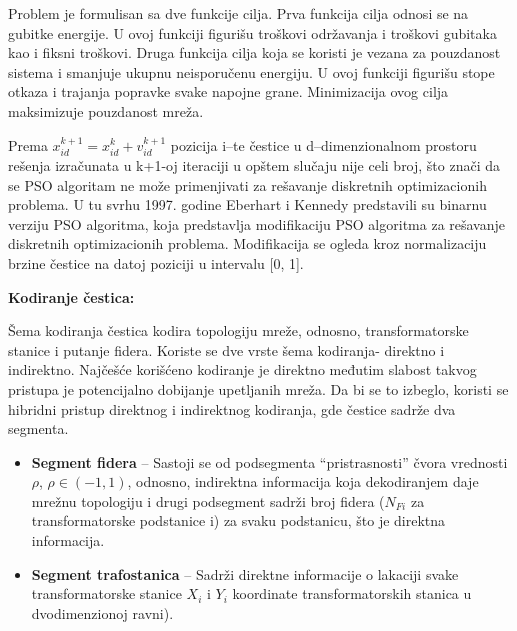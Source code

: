 \documentclass[a4paper]{article}
\begin{document}
\vspace{5mm} 

Problem je formulisan sa dve funkcije cilja. Prva funkcija cilja odnosi se na gubitke energije. U ovoj funkciji figurišu troškovi održavanja i troškovi gubitaka kao i fiksni troškovi. Druga funkcija cilja koja se koristi je vezana za pouzdanost sistema i smanjuje ukupnu neisporučenu energiju. U ovoj funkciji figurišu stope otkaza i trajanja popravke svake napojne grane. Minimizacija ovog cilja maksimizuje pouzdanost mreža.

\vspace{5mm} 

Prema \(x_{i d}^{k+1} = x_{i d}^{k} + v_{i d}^{k+1}  \) pozicija i–te čestice u d–dimenzionalnom prostoru rešenja izračunata u k+1-oj iteraciji u opštem slučaju nije celi broj, što znači da se PSO algoritam ne može primenjivati za rešavanje diskretnih optimizacionih problema. U tu svrhu 1997. godine Eberhart i Kennedy predstavili su binarnu verziju PSO algoritma, koja predstavlja modifikaciju PSO algoritma za rešavanje diskretnih optimizacionih problema. Modifikacija se ogleda kroz normalizaciju brzine čestice na datoj poziciji u intervalu [0, 1].

\vspace{10mm} 

\begin{flushleft}
\textbf{Kodiranje čestica:} 
\end{flushleft}

Šema kodiranja čestica kodira topologiju mreže, odnosno, transformatorske stanice i putanje fidera. Koriste se dve vrste šema kodiranja- direktno i indirektno. Najčešće korišćeno kodiranje je direktno međutim slabost takvog pristupa je potencijalno dobijanje upetljanih mreža. Da bi se to izbeglo, koristi se hibridni pristup direktnog i indirektnog kodiranja, gde čestice sadrže dva segmenta.

\vspace{5mm} 

\begin{itemize}
\item \textbf{Segment fidera} – Sastoji se od podsegmenta “pristrasnosti” čvora vrednosti $\rho$,  $\rho \in (-1,1)$, odnosno, indirektna informacija koja dekodiranjem daje mrežnu topologiju i drugi podsegment sadrži broj fidera (\(N_{Fi}\) za transformatorske podstanice i) za svaku podstanicu, što je direktna informacija.

\item \textbf{Segment trafostanica} – Sadrži direktne informacije o lakaciji svake transformatorske stanice \(X_{i}\) i \(Y_{i}\) koordinate transformatorskih stanica u dvodimenzionoj ravni).
\end{itemize}
\end{document}
